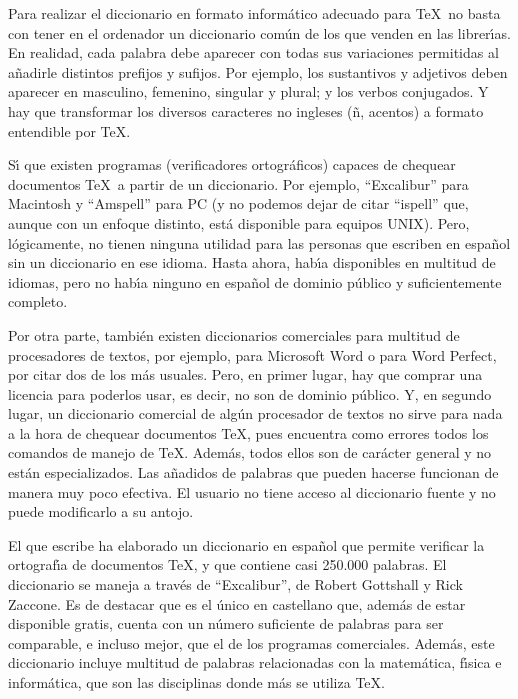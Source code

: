 

Para realizar el diccionario en formato inform\'atico adecuado para \TeX\ no
basta con tener en el ordenador un diccionario com\'un de los que venden en
las librer\'{\i}as. En realidad, cada palabra debe aparecer con todas sus
variaciones permitidas al a\~nadirle distintos prefijos y sufijos. Por
ejemplo, los sustantivos y adjetivos deben aparecer en masculino, femenino,
singular y plural; y los verbos conjugados. Y hay que transformar los
diversos caracteres no ingleses (\~n, acentos) a formato entendible por \TeX.

S\'{\i} que existen programas (verificadores ortogr\'aficos) capaces de
chequear documentos \TeX\ a partir de un diccionario. Por ejemplo,
``Excalibur'' para Macintosh y ``Amspell'' para PC (y no podemos dejar de
citar ``ispell'' que, aunque con un enfoque distinto, est\'a disponible para
equipos UNIX). Pero, l\'ogicamente, no tienen ninguna utilidad para las
personas que escriben en espa\~nol sin un diccionario en ese idioma. Hasta
ahora, hab\'{\i}a disponibles en multitud de idiomas, pero no hab\'{\i}a
ninguno en espa\~nol de dominio p\'ublico y suficientemente completo.

Por otra parte, tambi\'en existen diccionarios comerciales para multitud de
procesadores de textos, por ejemplo, para Microsoft Word o para Word Perfect,
por citar dos de los m\'as usuales. Pero, en primer lugar, hay que comprar una
licencia para poderlos usar, es decir, no son de dominio p\'ublico. Y, en
segundo lugar, un diccionario comercial de alg\'un procesador de textos no
sirve para nada a la hora de chequear documentos \TeX, pues encuentra como
errores todos los comandos de manejo de \TeX. Adem\'as, todos ellos son de
car\'acter general y no est\'an especializados. Las a\~nadidos de palabras que
pueden hacerse funcionan de manera muy poco efectiva. El usuario no tiene
acceso al diccionario fuente y no puede modificarlo a su antojo.

El que escribe ha elaborado un diccionario en espa\~nol que permite verificar
la ortograf\'{\i}a de documentos \TeX, y que contiene casi 250.000 palabras.
El diccionario se maneja a trav\'es de ``Excalibur'', de Robert Gottshall y
Rick Zaccone. Es de destacar que es el \'unico en castellano que, adem\'as de
estar disponible gratis, cuenta con un n\'umero suficiente de palabras
para ser comparable, e incluso mejor, que el de los programas comerciales.
Adem\'as, este diccionario incluye multitud de palabras relacionadas con la
matem\'atica, f\'{\i}sica e inform\'atica, que son las disciplinas donde
m\'as se utiliza \TeX.


